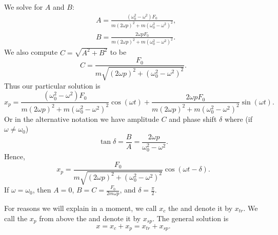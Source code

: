 \documentclass{ximera}
\begin{document}
We solve for $A$ and $B$:
\begin{align*}
    & A=\frac{(\omega_0^2-\omega^2) F_0} {m{(2\omega p)}^2+m{(\omega_0^2-\omega^2)}^2} , \\
    & B=\frac{2 \omega p F_0} {m{(2\omega p)}^2+m{(\omega_0^2-\omega^2)}^2} .
\end{align*}
We also compute $C = \sqrt{A^2+B^2}$ to be
\begin{equation*}
    C = \frac{F_0}{m \sqrt{{(2\omega p)}^2+{(\omega_0^2-\omega^2)}^2}} .
\end{equation*}
Thus our particular solution is
\begin{equation*}
    x_p = \frac{(\omega_0^2-\omega^2) F_0} {m{(2\omega p)}^2+m{(\omega_0^2-\omega^2)}^2} \cos (\omega t) + \frac{2 \omega p F_0} {m{(2\omega p)}^2+m{(\omega_0^2-\omega^2)}^2} \sin (\omega t) .
\end{equation*}
Or in the alternative notation we have amplitude $C$ and phase shift $\delta$ where (if $\omega \not= \omega_0$)
\begin{equation*}
    \tan \delta = \frac{B}{A} = \frac{2\omega p}{\omega_0^2-\omega^2} .
\end{equation*}
Hence,
\begin{equation*}
    x_p = 
    \frac{F_0}{m \sqrt{{(2\omega p)}^2+{(\omega_0^2-\omega^2)}^2}} 
    \cos ( \omega t - \delta ) .
\end{equation*}
If $\omega = \omega_0$, then $A=0$, $B = C = \frac{F_0}{2m\omega p}$, and $\delta = \frac{\pi}{2}$.






For reasons we will explain in a moment, we call $x_c$ the \emph{} and denote it by $x_{tr}$.  We call the $x_p$ from above the \emph{} and denote it by $x_{sp}$. The general solution is
\begin{equation*}
    x = x_c + x_p = x_{tr} + x_{sp} .
\end{equation*}
\end{document}
